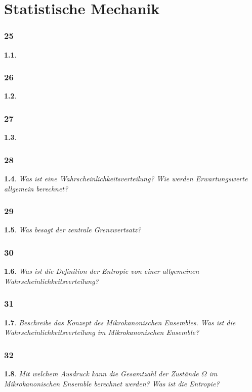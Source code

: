 \documentclass[12pt,a4paper]{report}
\newtheorem{myfrag}{}%
\begin{document}
\chapter{Statistische Mechanik}
\subsection{25}
\begin{myfrag}
\end{myfrag}
\subsection{26}
\begin{myfrag}
\end{myfrag}
\subsection{27}
\begin{myfrag}

\end{myfrag}
\subsection{28}
\begin{myfrag}
Was ist eine Wahrscheinlichkeitsverteilung? Wie werden Erwartungswerte
allgemein berechnet?
\end{myfrag}
\subsection{29}
\begin{myfrag}
Was besagt der zentrale Grenzwertsatz?
\end{myfrag}
\subsection{30}
\begin{myfrag}
Was ist die Definition der Entropie von einer allgemeinen Wahrscheinlichkeitsverteilung?
\end{myfrag}
\subsection{31}
\begin{myfrag}
Beschreibe das Konzept des Mikrokanonischen Ensembles. Was ist die
Wahrscheinlichkeitsverteilung im Mikrokanonischen Ensemble?
\end{myfrag}
\subsection{32}
\begin{myfrag}
Mit welchem Ausdruck kann die Gesamtzahl der Zustände $\Omega$ im
Mikrokanonischen Ensemble berechnet werden? Was ist die Entropie?
\end{myfrag}
\end{document}
